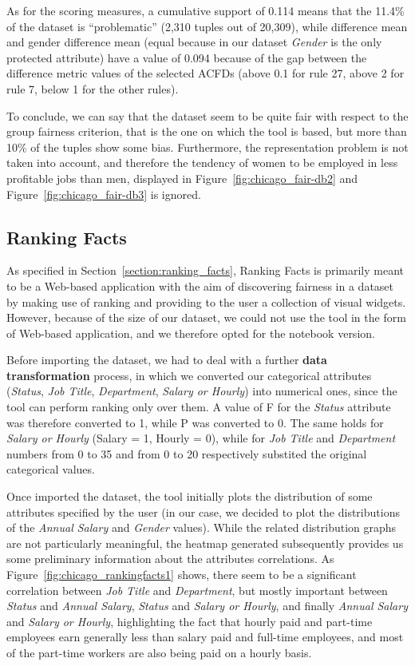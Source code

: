 As for the scoring measures, a cumulative support of 0.114 means that the 11.4\% of the dataset is ``problematic'' (2,310 tuples out of 20,309), while difference mean and gender difference mean (equal because in our dataset \textit{Gender} is the only protected attribute) have a value of 0.094 because of the gap between the difference metric values of the selected ACFDs (above 0.1 for rule 27, above 2 for rule 7, below 1 for the other rules).

To conclude, we can say that the dataset seem to be quite fair with respect to the group fairness criterion, that is the one on which the tool is based, but more than 10\% of the tuples show some bias. Furthermore, the representation problem is not taken into account, and therefore the tendency of women to be employed in less profitable jobs than men, displayed in Figure~\ref{fig:chicago_fair-db2} and Figure~\ref{fig:chicago_fair-db3} is ignored.


\subsection{Ranking Facts}
As specified in Section~\ref{section:ranking_facts}, Ranking Facts is primarily meant to be a Web-based application with the aim of discovering fairness in a dataset by making use of ranking and providing to the user a collection of visual widgets. However, because of the size of our dataset, we could not use the tool in the form of Web-based application, and we therefore opted for the notebook version.

Before importing the dataset, we had to deal with a further \textbf{data transformation} process, in which we converted our categorical attributes (\textit{Status}, \textit{Job Title}, \textit{Department}, \textit{Salary or Hourly}) into numerical ones, since the tool can perform ranking only over them. A value of F for the \textit{Status} attribute was therefore converted to 1, while P was converted to 0. The same holds for \textit{Salary or Hourly} (Salary = 1, Hourly = 0), while for \textit{Job Title} and \textit{Department} numbers from 0 to 35 and from 0 to 20 respectively substited the original categorical values.

Once imported the dataset, the tool initially plots the distribution of some attributes specified by the user (in our case, we decided to plot the distributions of the \textit{Annual Salary} and \textit{Gender} values). While the related distribution graphs are not particularly meaningful, the heatmap generated subsequently provides us some preliminary information about the attributes correlations. As Figure~\ref{fig:chicago_rankingfacts1} shows, there seem to be a significant correlation between \textit{Job Title} and \textit{Department}, but mostly important between \textit{Status} and \textit{Annual Salary}, \textit{Status} and \textit{Salary or Hourly}, and finally \textit{Annual Salary} and \textit{Salary or Hourly}, highlighting the fact that hourly paid and part-time employees earn generally less than salary paid and full-time employees, and most of the part-time workers are also being paid on a hourly basis.

